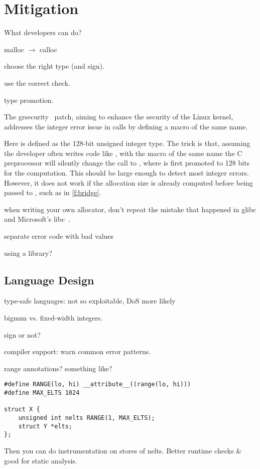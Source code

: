 \section{Mitigation}
\label{s:miti}

What developers can do?

malloc $\to$ calloc

choose the right type (and sign).

use the correct check.

type promotion.

The grsecurity~\cite{grsecurity} patch, aiming to enhance the
security of the Linux kernel, addresses the integer error issue
in  calls by defining a macro of the same name.
%

%
Here  is defined as the 128-bit unsigned integer
type.  The trick is that, assuming the developer often writes code
like , with the macro of the same name
the C preprocessor will silently change the call to
, where  is first
promoted to 128 bits for the computation.  This should be large
enough to detect most integer errors.  However, it does not work
if the allocation size is already computed before being passed to
, such as in \autoref{f:bridge}.

when writing your own allocator, don't repeat the mistake that
happened in glibc and Microsoft's libc~\cite{rus-cert:calloc}.

separate error code with bad values

using a library?

\subsection{Language Design}

type-safe languages: not so exploitable, DoS more likely

bignum vs. fixed-width integers.

sign or not?

compiler support: warn common error patterns.

range annotations?  something like?
\begin{Verbatim}
#define RANGE(lo, hi) __attribute__((range(lo, hi)))
#define MAX_ELTS 1024

struct X {
	unsigned int nelts RANGE(1, MAX_ELTS);
	struct Y *elts;
};
\end{Verbatim}
Then you can do instrumentation on stores of nelts.
Better runtime checks \& good for static analysis.

